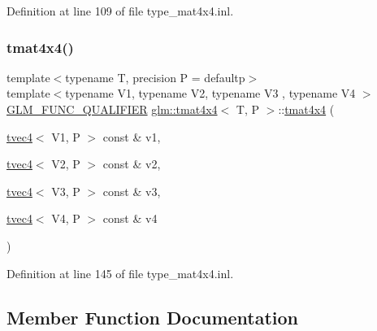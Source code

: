 Definition at line 109 of file type\+\_\+mat4x4.\+inl.

\mbox{\label{structglm_1_1tmat4x4_ac1a85b66f907df34234fa6860cfa2cf1}} 
\subsubsection{\texorpdfstring{tmat4x4()}{tmat4x4()}\hspace{0.1cm}{\footnotesize\ttfamily [22/22]}}
{\footnotesize\ttfamily template$<$typename T, precision P = defaultp$>$ \\
template$<$typename V1, typename V2, typename V3 , typename V4 $>$ \\
\mbox{\hyperlink{setup_8hpp_a33fdea6f91c5f834105f7415e2a64407}{G\+L\+M\+\_\+\+F\+U\+N\+C\+\_\+\+Q\+U\+A\+L\+I\+F\+I\+ER}} \mbox{\hyperlink{structglm_1_1tmat4x4}{glm\+::tmat4x4}}$<$ T, P $>$\+::\mbox{\hyperlink{structglm_1_1tmat4x4}{tmat4x4}} (\begin{DoxyParamCaption}\item[{\mbox{\hyperlink{structglm_1_1tvec4}{tvec4}}$<$ V1, P $>$ const \&}]{v1,  }\item[{\mbox{\hyperlink{structglm_1_1tvec4}{tvec4}}$<$ V2, P $>$ const \&}]{v2,  }\item[{\mbox{\hyperlink{structglm_1_1tvec4}{tvec4}}$<$ V3, P $>$ const \&}]{v3,  }\item[{\mbox{\hyperlink{structglm_1_1tvec4}{tvec4}}$<$ V4, P $>$ const \&}]{v4 }\end{DoxyParamCaption})}



Definition at line 145 of file type\+\_\+mat4x4.\+inl.



\subsection{Member Function Documentation}
\mbox{\label{structglm_1_1tmat4x4_aaa9ea3c2a377939018c48646b3768311}} 
